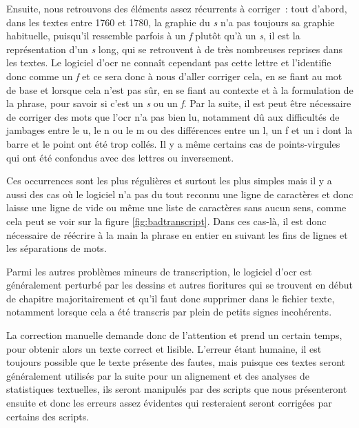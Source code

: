 Ensuite, nous retrouvons des éléments assez récurrents à corriger~: tout d'abord,  dans les textes entre 1760 et 1780, la graphie du \textit{s} n'a pas toujours sa graphie habituelle, puisqu'il ressemble parfois à un \textit{f} plutôt qu'à un \textit{s}, il est la représentation d'un \textit{s} long, qui se retrouvent à de très nombreuses reprises dans les textes. Le logiciel d'\acrshort{ocr} ne connaît cependant pas cette lettre et l'identifie donc comme un \textit{f} et ce sera donc à nous d'aller corriger cela, en se fiant au mot de base et lorsque cela n'est pas sûr, en se fiant au contexte et à la formulation de la phrase, pour savoir si c'est un \textit{s} ou un \textit{f}. \newline
Par la suite, il est peut être nécessaire de corriger des mots que l'\acrshort{ocr} n'a pas bien lu, notamment dû aux difficultés de jambages entre le u, le n ou le m ou des différences entre un l, un f et un i dont la barre et le point ont été trop collés. Il y a même certains cas de points-virgules qui ont été confondus avec des lettres ou inversement.

Ces occurrences sont les plus régulières et surtout les plus simples mais il y a aussi des cas où le logiciel n'a pas du tout reconnu une ligne de caractères et donc laisse une ligne de vide ou même une liste de caractères sans aucun sens, comme cela peut se voir sur la figure \ref{fig:badtranscript}. Dans ces cas-là, il est donc nécessaire de réécrire à la main la phrase en entier en suivant les fins de lignes et les séparations de mots.

Parmi les autres problèmes mineurs de transcription, le logiciel d'\acrshort{ocr} est généralement perturbé par les dessins et autres fioritures qui se trouvent en début de chapitre majoritairement et qu'il faut donc supprimer dans le fichier texte, notamment lorsque cela a été transcris par plein de petits signes incohérents.

La correction manuelle demande donc de l'attention et prend un certain temps, pour obtenir alors un texte correct et lisible. L'erreur étant humaine, il est toujours possible que le texte présente des fautes, mais puisque ces textes seront généralement utilisés par la suite pour un alignement et des analyses de statistiques textuelles, ils seront manipulés par des scripts que nous présenteront ensuite et donc les erreurs assez évidentes qui resteraient seront corrigées par certains des scripts.


